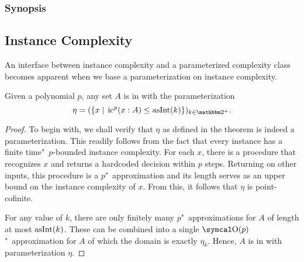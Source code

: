 \subsubsection{Synopsis}

\subsection{Instance Complexity}
An interface between instance complexity and a parameterized complexity class becomes apparent when we base a parameterization on instance complexity.
\begin{theorem}
\label{thm:nufptic}%
  Given a polynomial $p$, any set $A$ is in  with the parameterization
  \begin{equation*}
    \eta \deq (\{x \st \ic^p(x : A) \le \asNat(k)\})_{k \in \binary^+}.
  \end{equation*}
\end{theorem}
\begin{proof}
  To begin with, we shall verify that $\eta$ as defined in the theorem is indeed a parameterization.
  This readily follows from the fact that every instance has a finite time"~$p$-bounded instance complexity.
  For each $x$, there is a procedure that recognizes $x$ and returns a hardcoded decision within $p$ steps.
  Returning  on other inputs, this procedure is a $p$"~approximation and its length serves as an upper bound on the instance complexity of $x$.
  From this, it follows that $\eta$ is point-cofinite.

  For any value of $k$, there are only finitely many $p$"~approximations for $A$ of length at most $\operatorname{asInt}(k)$.
  These can be combined into a single $\bigO(p)$"~approximation for $A$ of which the domain is exactly $\eta_k$.
  Hence, $A$ is in  with parameterization $\eta$.
\end{proof}

